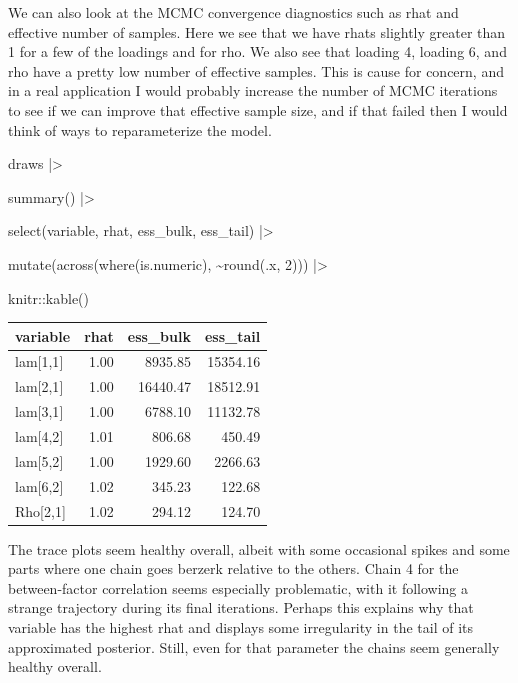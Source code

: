 \documentclass[
  letterpaper,
  DIV=11,
  numbers=noendperiod]{scrreprt}
\newenvironment{Shaded}{\begin{snugshade}}{\end{snugshade}}
\newcommand{\DecValTok}[1]{\textcolor[rgb]{0.68,0.00,0.00}{#1}}
\newcommand{\FunctionTok}[1]{\textcolor[rgb]{0.28,0.35,0.67}{#1}}
\newcommand{\NormalTok}[1]{\textcolor[rgb]{0.00,0.23,0.31}{#1}}
\newcommand{\SpecialCharTok}[1]{\textcolor[rgb]{0.37,0.37,0.37}{#1}}
\begin{document}
We can also look at the MCMC convergence diagnostics such as rhat and
effective number of samples. Here we see that we have rhats slightly
greater than 1 for a few of the loadings and for rho. We also see that
loading 4, loading 6, and rho have a pretty low number of effective
samples. This is cause for concern, and in a real application I would
probably increase the number of MCMC iterations to see if we can improve
that effective sample size, and if that failed then I would think of
ways to reparameterize the model.

\begin{Shaded}
\begin{Highlighting}[]
\NormalTok{draws }\SpecialCharTok{|\textgreater{}} 

  \FunctionTok{summary}\NormalTok{() }\SpecialCharTok{|\textgreater{}}

  \FunctionTok{select}\NormalTok{(variable, rhat, ess\_bulk, ess\_tail) }\SpecialCharTok{|\textgreater{}}

  \FunctionTok{mutate}\NormalTok{(}\FunctionTok{across}\NormalTok{(}\FunctionTok{where}\NormalTok{(is.numeric), }\SpecialCharTok{\textasciitilde{}}\FunctionTok{round}\NormalTok{(.x, }\DecValTok{2}\NormalTok{))) }\SpecialCharTok{|\textgreater{}}

\NormalTok{  knitr}\SpecialCharTok{::}\FunctionTok{kable}\NormalTok{()}
\end{Highlighting}
\end{Shaded}

\begin{longtable}[]{@{}lrrr@{}}
\toprule()
variable & rhat & ess\_bulk & ess\_tail \\
\midrule()
\endhead
lam{[}1,1{]} & 1.00 & 8935.85 & 15354.16 \\
lam{[}2,1{]} & 1.00 & 16440.47 & 18512.91 \\
lam{[}3,1{]} & 1.00 & 6788.10 & 11132.78 \\
lam{[}4,2{]} & 1.01 & 806.68 & 450.49 \\
lam{[}5,2{]} & 1.00 & 1929.60 & 2266.63 \\
lam{[}6,2{]} & 1.02 & 345.23 & 122.68 \\
Rho{[}2,1{]} & 1.02 & 294.12 & 124.70 \\
\bottomrule()
\end{longtable}

The trace plots seem healthy overall, albeit with some occasional spikes
and some parts where one chain goes berzerk relative to the others.
Chain 4 for the between-factor correlation seems especially problematic,
with it following a strange trajectory during its final iterations.
Perhaps this explains why that variable has the highest rhat and
displays some irregularity in the tail of its approximated posterior.
Still, even for that parameter the chains seem generally healthy
overall.
\end{document}
